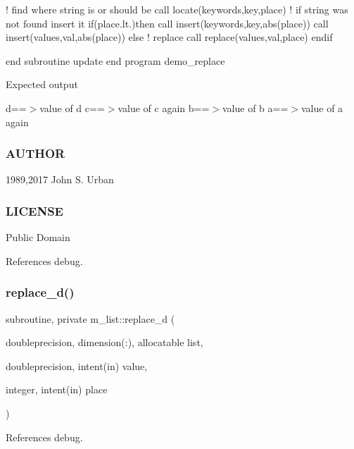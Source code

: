 ! find where string is or should be call locate(keywords,key,place) ! if string was not found insert it if(place.\+lt.)then call insert(keywords,key,abs(place)) call insert(values,val,abs(place)) else ! replace call replace(values,val,place) endif

end subroutine update end program demo\+\_\+replace

Expected output

d==$>$value of d c==$>$value of c again b==$>$value of b a==$>$value of a again

\subsubsection*{A\+U\+T\+H\+OR}

1989,2017 John S. Urban \subsubsection*{L\+I\+C\+E\+N\+SE}

Public Domain 

References debug.

\mbox{\label{namespacem__list_a9cac0a0b0d325d26267d37648f8eada6}} 
\subsubsection{\texorpdfstring{replace\+\_\+d()}{replace\_d()}}
{\footnotesize\ttfamily subroutine, private m\+\_\+list\+::replace\+\_\+d (\begin{DoxyParamCaption}\item[{doubleprecision, dimension(\+:), allocatable}]{list,  }\item[{doubleprecision, intent(in)}]{value,  }\item[{integer, intent(in)}]{place }\end{DoxyParamCaption})\hspace{0.3cm}{\ttfamily [private]}}



References debug.

\mbox{\label{namespacem__list_a8c67651ca2c2c90d921f23146577491b}} 
